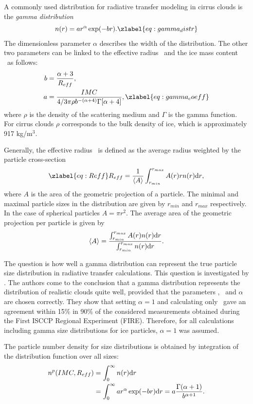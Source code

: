 A commonly used distribution for radiative transfer modeling in cirrus
clouds is the \emph{gamma distribution}
\begin{equation}
  n(r) = a  r^\alpha \exp(-br).
\zlabel{eq:gamma_distr}
\end{equation}
The dimensionless parameter $\alpha$ describes the width of the
distribution. The other two parameters can be linked to the effective
radius \Reff\ and the ice mass content \imc\ as follows:
\begin{eqnarray}
  b &= \frac{\alpha+3}{\Reff},\\
  a &= \frac{\imc}{4/3\pi\rho b^{-(\alpha+4)}\Gamma[\alpha+4]},
\zlabel{eq:gamma_coeff}
\end{eqnarray}
where $\rho$ is the density of the scattering medium and $\Gamma$ is
the gamma function. For cirrus clouds $\rho$ corresponds to the bulk
density of ice, which is approximately 917 kg/m$^3$.

Generally, the effective radius \Reff\ is defined as the average
radius weighted by the particle cross-section
\begin{equation}
  \zlabel{eq:Reff}
  \Reff= \frac{1}{\EnsAvr{A}} \int_{r_{min}}^{r_{max}} {A(r) r n(r) \DiffD r},
\end{equation}
where $A$ is the area of the geometric projection of a particle. The
minimal and maximal particle sizes in the distribution are given by
$r_{min}$ and $r_{max}$ respectively. In the case of spherical
particles $A = \pi r^2$. The average area of the geometric projection
per particle  is given by
\begin{equation}
  \left\langle A \right\rangle = \frac{\int_{r_{min}}^{r_{max}} {A(r) n(r) \mathrm{d} r}}{\int_{r_{min}}^{r_{max}} {n(r) \mathrm{d} r}}.
\end{equation}

The question is how well a gamma distribution can represent the true
particle size distribution in radiative transfer calculations. This
question is investigated by \citet{evans:98}. The authors come to the
conclusion that a gamma distribution represents the distribution of
realistic clouds quite well, provided that the parameters \Reff, \imc\ 
and $\alpha$ are chosen correctly. They show that setting $\alpha = 1$
and calculating only \Reff\ gave an agreement within 15\% in 90\% of
the considered measurements obtained during the First ISCCP Regional
Experiment (FIRE).  Therefore, for all calculations including gamma
size distributions for ice particles, $\alpha = 1$ was assumed.  

The particle number density for size distributions is obtained by
integration of the distribution function over all sizes:
\begin{eqnarray}
  n^p(IMC, R_{eff}) &= \int_0^\infty {n(r)\ensuremath{\mathrm{d}}r} \\
 &= \int_0^\infty {a  r^\alpha \exp(-br)
    \ensuremath{\mathrm{d}}r} = a \frac{\Gamma(\alpha+1)}{b^{\alpha+1}}.
\end{eqnarray}

